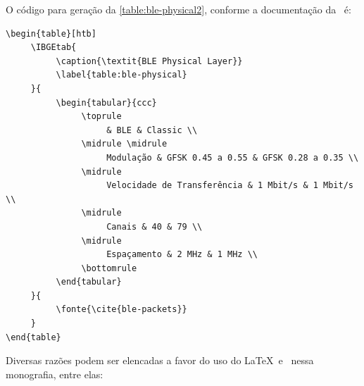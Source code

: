 \begin{table}[htb]
\end{table}

O código para geração da \autoref{table:ble-physical2}, conforme a documentação da \abnTeX\, é:
\\ %
\begin{verbatim}
\begin{table}[htb]
     \IBGEtab{
          \caption{\textit{BLE Physical Layer}}
          \label{table:ble-physical}
     }{
          \begin{tabular}{ccc}
               \toprule
                    & BLE & Classic \\
               \midrule \midrule
                    Modulação & GFSK 0.45 a 0.55 & GFSK 0.28 a 0.35 \\
               \midrule
                    Velocidade de Transferência & 1 Mbit/s & 1 Mbit/s \\
               \midrule 
                    Canais & 40 & 79 \\
               \midrule 
                    Espaçamento & 2 MHz & 1 MHz \\
               \bottomrule
          \end{tabular}
     }{
          \fonte{\cite{ble-packets}}
     }
\end{table}
\end{verbatim}

Diversas razões podem ser elencadas a favor do uso do \LaTeX\ e \abnTeX\ nessa monografia, entre elas:

